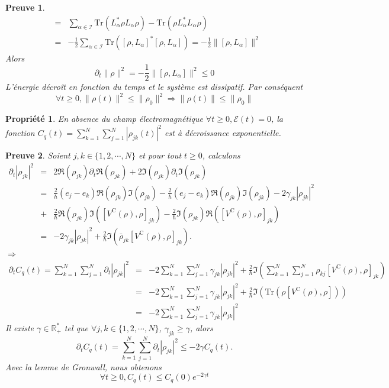 \documentclass[a4paper]{article}
\newtheorem{property}{Propriété}[section]
\newtheorem*{preuve}{\textbf{Preuve}}
\newcommand{\dt}{\partial_{t}}
\newcommand{\rC}{\mathrm{C}}
\newcommand{\Tr}{{\mathrm{Tr}}}
\begin{document}
\begin{itemize}
\begin{preuve}
\begin{eqnarray*}
&=& \sum_{\alpha \in \mathcal{I}} \Tr\left(   L_{\alpha}^*\rho L_{\alpha}\rho\right) -\Tr\left( \rho L_{\alpha}^* L_{\alpha}\rho\right) \\
&=&-\frac12 \sum_{\alpha \in \mathcal{I}} \Tr\left( \left[\rho,L_{\alpha}\right]^* \left[\rho,L_{\alpha}\right]\right) = -\frac12 \| \left[\rho,L_{\alpha}\right]\|^2
\end{eqnarray*}
Alors 
$$\dt \|\rho\|^2 =-\frac12 \| \left[\rho,L_{\alpha}\right]\|^2 \leq 0$$
L'énergie décroît en fonction du temps et le système est dissipatif. Par conséquent 
$$\forall t \geq 0,  \|\rho(t)\|^2 \leq  \|\rho_0\|^2  \Rightarrow  \|\rho(t)\| \leq  \|\rho_0\|$$  
\end{preuve}
\begin{property}
En absence du champ électromagnétique $\forall t\geq 0, \mathcal{E}(t)=0$, la fonction
$ C_q(t)=\sum_{k=1}^{N}\sum_{j=1}^{N}|\rho_{jk} (t)|^2 $ est à décroissance exponentielle.
\end{property}
\begin{preuve}
Soient $ j, k \in\{1,2,\cdots,N\}$ et pour tout $t\geq 0$, calculons 
\begin{eqnarray*}
\dt |\rho_{jk} |^2 &=& 2 \Re\left(\rho_{jk} \right)\dt \Re\left(\rho_{jk} \right) +2 \Im\left(\rho_{jk} \right)\dt \Im\left(\rho_{jk} \right) \\
&=&  \frac{2}{\hbar} \left( e_j-e_k\right)\Re\left(\rho_{jk} \right)\Im\left(\rho_{jk} \right)-\frac{2}{\hbar} \left( e_j-e_k\right)\Re\left(\rho_{jk} \right)\Im\left(\rho_{jk} \right)-2\gamma_{jk}  |\rho_{jk} |^2\\
&+& \frac{2}{\hbar}\Re\left(\rho_{jk} \right)\Im\left( \left[ V^{\rC}(\rho),\rho\right]_{jk}\right) -\frac{2}{\hbar}\Im\left(\rho_{jk} \right)\Re\left( \left[ V^{\rC}(\rho),\rho\right]_{jk}\right)\\
&=& -2\gamma_{jk}  |\rho_{jk} |^2+\frac{2}{\hbar} \Im\left(\bar{\rho}_{jk} \left[ V^{\rC}(\rho),\rho\right]_{jk}\right).
\end{eqnarray*}
$\Rightarrow$ 
\begin{eqnarray*}
\dt C_q(t)=\sum_{k=1}^{N}\sum_{j=1}^{N}\dt  |\rho_{jk} |^2 &=&- 2\sum_{k=1}^{N}\sum_{j=1}^{N}\gamma_{jk}  |\rho_{jk} |^2+ \frac{2}{\hbar} \Im\left(\sum_{k=1}^{N}\sum_{j=1}^{N}\rho_{kj}\left[ V^{\rC}(\rho),\rho\right]_{jk}\right)\\
&=& - 2\sum_{k=1}^{N}\sum_{j=1}^{N}\gamma_{jk}  |\rho_{jk} |^2+\frac{2}{\hbar} \Im\left( \Tr\left(\rho\left[ V^{\rC}(\rho),\rho\right]\right) \right) \\
&=& - 2\sum_{k=1}^{N}\sum_{j=1}^{N}\gamma_{jk}  |\rho_{jk} |^2
\end{eqnarray*}
Il existe $\gamma \in \mathbb{R}_{+}^{*}$ tel que $\forall j,k \in\{1,2,\cdots,N\}$, $\gamma_{jk}\geq \gamma$, alors 
$$\dt C_q(t) =\sum_{k=1}^{N}\sum_{j=1}^{N}\dt  |\rho_{jk} |^2 \leq -2  \gamma C_q(t).$$
Avec la lemme de Gronwall, nous obtenons
$$\forall t \geq 0, C_q(t) \leq C_q(0) e^{-2\gamma t}$$
\end{preuve}




\end{itemize}
\end{document}
